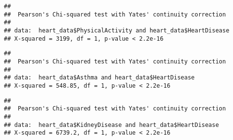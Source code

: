 \documentclass[
]{article}
\newenvironment{Shaded}{\begin{snugshade}}{\end{snugshade}}
\newcommand{\FunctionTok}[1]{\textcolor[rgb]{0.00,0.00,0.00}{#1}}
\newcommand{\NormalTok}[1]{#1}
\newcommand{\SpecialCharTok}[1]{\textcolor[rgb]{0.00,0.00,0.00}{#1}}
\begin{document}
\begin{Shaded}
\end{Shaded}

\begin{verbatim}
## 
##  Pearson's Chi-squared test with Yates' continuity correction
## 
## data:  heart_data$PhysicalActivity and heart_data$HeartDisease
## X-squared = 3199, df = 1, p-value < 2.2e-16
\end{verbatim}

\begin{Shaded}
\end{Shaded}

\begin{verbatim}
## 
##  Pearson's Chi-squared test with Yates' continuity correction
## 
## data:  heart_data$Asthma and heart_data$HeartDisease
## X-squared = 548.85, df = 1, p-value < 2.2e-16
\end{verbatim}

\begin{Shaded}
\end{Shaded}

\begin{verbatim}
## 
##  Pearson's Chi-squared test with Yates' continuity correction
## 
## data:  heart_data$KidneyDisease and heart_data$HeartDisease
## X-squared = 6739.2, df = 1, p-value < 2.2e-16
\end{verbatim}

\begin{Shaded}
\end{Shaded}
\end{document}

